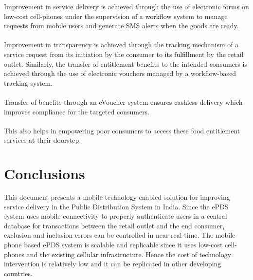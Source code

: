 \documentclass{article}
\begin{document}
Improvement in service delivery is achieved through the use of electronic forms on low-cost cell-phones under the supervision of a workflow system to manage requests from mobile users and generate SMS alerts when the goods are ready. \\ \\Improvement in transparency is achieved through the tracking mechanism of a service request from its initiation by the consumer to its fulfillment by the retail outlet. Similarly, the transfer of entitlement benefits to the intended consumers is achieved through the use of electronic vouchers managed by a workflow-based tracking system. \\ \\ Transfer of benefits through an eVoucher system ensures cashless delivery which improves compliance for the targeted consumers. \\ \\This also helps in empowering poor consumers to access these food entitlement services at their doorstep.


\section{Conclusions}

This document presents a mobile technology enabled solution for improving service delivery in the Public Distribution System in India. Since the ePDS system uses mobile connectivity to properly authenticate users in a central database for transactions between the retail outlet and the end consumer, exclusion and inclusion errors can be controlled in near real-time. The mobile phone based ePDS system is scalable and replicable since it uses low-cost cell-phones and the existing cellular infrastructure. Hence the cost of technology intervention is relatively low and it can be replicated in other developing countries.

\pagebreak
\end{document}
